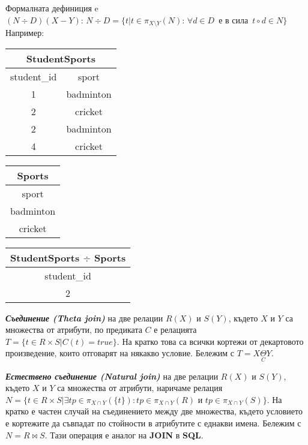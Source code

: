 \documentclass[fleqn,12pt]{article}
\begin{document}
Формалната дефиниция e $(N \div D)(X-Y): \, N \div D = \{t | t \in \pi_{X \setminus Y} (N) :\, \forall d \in D \,$ е в сила $\, t \circ d \in N \}$\\
Например:\\

\begin{multicols}{3}
\begin{center}
\begin{tabular}{ |c|c| }
    \hline
    \multicolumn{2}{|c|}{StudentSports} \\
    \hline
    student\_id & sport \\
    \hline
    1 & badminton \\
    2 & cricket \\
    2 & badminton \\
    4 & cricket \\
    \hline
\end{tabular}
\end{center}

\begin{center}
\begin{tabular}{ |c| } 
    \hline
    \multicolumn{1}{|c|}{Sports} \\
    \hline
    sport \\
    \hline
    badminton \\
    cricket \\
    \hline
\end{tabular}
\end{center}

\begin{center}
\begin{tabular}{ |c| } 
    \hline
    \multicolumn{1}{|c|}{StudentSports $\div$ Sports} \\
    \hline
    student\_id \\
    \hline
    2 \\
    \hline
\end{tabular}
\end{center}

\end{multicols}

\textbf{\textit{Съединение (Theta join)}} на две релации $R(X)$ и $S(Y)$, където $X$ и $Y$ са множества от атрибути, по предиката $C$ е релацията $T = \{t \in R \times S | C(t) = true\}$.
На кратко това са всички кортежи от декартовото произведение, които отговарят на някакво условие.
\bigbreak
Бележим с $T = X \underset{C}{\Theta} Y$.

\textbf{\textit{Естествено съединение (Natural join)}} на две релации $R(X)$ и $S(Y)$, където $X$ и $Y$ са множества от атрибути, наричаме релация $N = \{t \in R \times S | \exists tp \in \pi_{X \cap Y}(\{t\}): tp \in \pi_{X \cap Y}(R)$ и $tp \in \pi_{X \cap Y}(S)\}$.
На кратко е частен случай на съединението между две множества, където условието е кортежите да съвпадат по стойности в атрибутите с еднакви имена.
\bigbreak
Бележим с $N = R \bowtie S$. Тази операция е аналог на \textbf{JOIN} в \textbf{SQL}.
\end{document}
